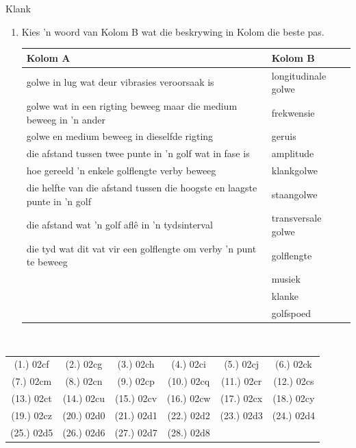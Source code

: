 \begin{eocexercises}{Klank}
\begin{enumerate}[noitemsep, label=\textbf{\arabic*}. ]
\item Kies 'n woord van Kolom B wat die beskrywing in Kolom die beste pas.
\hspace*{-3cm}
\begin{minipage}{0.75\textwidth}
\begin{tabular}{ll}
\textbf{Kolom A} & \textbf{Kolom B} \\ \hline
golwe in lug wat deur vibrasies veroorsaak is & longitudinale golwe \\
golwe wat in een rigting beweeg maar die medium beweeg in 'n ander & frekwensie \\
golwe en medium beweeg in dieselfde rigting  & geruis \\
die afstand tussen twee punte in 'n golf wat in fase is & amplitude \\
hoe gereeld 'n enkele golflengte verby beweeg & klankgolwe \\
die helfte van die afstand tussen die hoogste en laagste punte in 'n golf & staangolwe \\
die afstand wat 'n golf afl\^e in 'n tydsinterval & transversale golwe \\
die tyd wat dit vat vir een golflengte om verby 'n punt te beweeg & golflengte \\
& musiek \\
& klanke \\
& golfspoed \\
\end{tabular}
\end{minipage}\\
\end{enumerate}
  \label{m38800**end}
  \label{9b5d72dd5f0585e544578ab90a9956a8**end}
\par \practiceinfo
\par \begin{tabular}[h]{cccccc}
(1.)	02cf	&
(2.)	02cg	&
(3.)	02ch	&
(4.)	02ci	&
(5.)	02cj	&
(6.)	02ck	\\ %
(7.)	02cm	&
(8.)	02cn	&
(9.)	02cp	&
(10.)	02cq	&
(11.)	02cr	&
(12.)	02cs	\\ %
(13.)	02ct	&
(14.)	02cu	&
(15.)	02cv	&
(16.)	02cw	&
(17.)	02cx	&
(18.)	02cy	\\ %
(19.)	02cz	&
(20.)	02d0	&
(21.)	02d1	&
(22.)	02d2	&
(23.)	02d3	&
(24.)	02d4	\\ %
(25.)	02d5	&
(26.)	02d6	&
(27.)	02d7	&
(28.)	02d8	&
\end{tabular}
\end{eocexercises}
